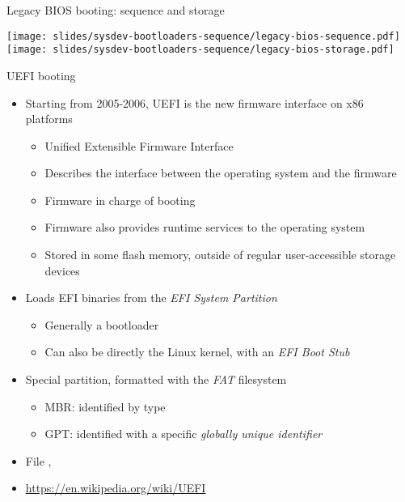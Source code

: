 \begin{frame}{Legacy BIOS booting: sequence and storage}
  \begin{center}
    \texttt{[image: slides/sysdev-bootloaders-sequence/legacy-bios-sequence.pdf]}\\
    \vspace{0.5cm}
    \texttt{[image: slides/sysdev-bootloaders-sequence/legacy-bios-storage.pdf]}
  \end{center}
\end{frame}

\begin{frame}{UEFI booting}
  \begin{itemize}
  \item Starting from 2005-2006, UEFI is the new firmware interface on
    x86 platforms
    \begin{itemize}
    \item Unified Extensible Firmware Interface
    \item Describes the interface between the operating system and the
      firmware
    \item Firmware in charge of booting
    \item Firmware also provides runtime services to the operating
      system
    \item Stored in some flash memory, outside of regular
      user-accessible storage devices
    \end{itemize}
  \item Loads EFI binaries from the {\em EFI System Partition}
    \begin{itemize}
    \item Generally a bootloader
    \item Can also be directly the Linux kernel, with an {\em EFI Boot
        Stub}
    \end{itemize}
  \item Special partition, formatted with the {\em FAT} filesystem
    \begin{itemize}
    \item MBR: identified by type 
    \item GPT: identified with a specific {\em globally unique identifier}
    \end{itemize}
  \item File , 
  \item \url{https://en.wikipedia.org/wiki/UEFI}
  \end{itemize}
\end{frame}

